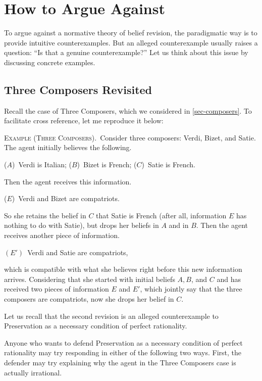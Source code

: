 \section{How to Argue Against}\label{sec-argue-against}

To argue against a normative theory of belief revision, the paradigmatic way is to provide intuitive counterexamples. But an alleged counterexample usually raises a question: ``Is that a genuine counterexample?'' Let us think about this issue by discussing concrete examples.

\subsection{Three Composers Revisited}

Recall the case of Three Composers, which we considered in \autoref{sec-composers}. To facilitate cross reference, let me reproduce it below:\op
 
	\xm \textsc{Example (Three Composers).}\, Consider three composers: Verdi, Bizet, and Satie. The agent initially believes the following. \op

		\xm ($A$)\, Verdi is Italian;
		\xm ($B$)\, Bizet is French;
		\xm ($C$)\, Satie is French. 

	\ed Then the agent receives this information. \op

		\xm ($E$)\, Verdi and Bizet are compatriots. 

	\ed So she retains the belief in $C$ that Satie is French (after all, information $E$ has nothing to do with Satie), but drops her beliefs in $A$ and in $B$. Then the agent receives another piece of information. \op

	\xm $(E')$\, Verdi and Satie are compatriots,

	\ed which is compatible with what she believes right before this new information arrives. Considering that she started with initial beliefs $A, B$, and $C$ and has received two pieces of information $E$ and $E'$, which jointly say that the three composers are compatriots, now she drops her belief in $C$. 

\ed Let us recall that the second revision is an alleged counterexample to Preservation as a necessary condition of perfect rationality. 

Anyone who wants to defend Preservation as a necessary condition of perfect rationality may try responding in either of the following two ways. First, the defender may try explaining why the agent in the Three Composers case is actually irrational.

